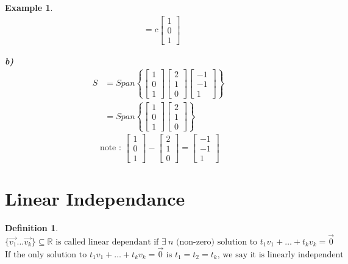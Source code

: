 \documentclass{article}
\newtheorem{ex}[theorem]{Example}
\newtheorem{definition}[theorem]{Definition}
\begin{document}
\begin{ex}
\begin{minipage}{.5\textwidth}
\[\begin{aligned}
& = c\begin{bmatrix} 1 \\ 0 \\ 1 \end{bmatrix} \end{aligned} \]
\end{minipage} %
\begin{minipage}{.5\textwidth} %
\textbf{b)}
\[ \begin{aligned} S & = Span\left\{ \begin{bmatrix} 1 \\ 0 \\ 1 \end{bmatrix} \begin{bmatrix} 2 \\ 1 \\  0\end{bmatrix} \begin{bmatrix} -1 \\ -1 \\ 1 \end{bmatrix} \right\} \\ 
& = Span\left\{ \begin{bmatrix} 1 \\ 0 \\ 1 \end{bmatrix} \begin{bmatrix} 2 \\ 1 \\  0\end{bmatrix} \right\} \end{aligned} \]
\[ \text{ note : } \begin{bmatrix} 1 \\ 0 \\ 1 \end{bmatrix} -  \begin{bmatrix} 2 \\ 1 \\  0\end{bmatrix} = \begin{bmatrix} -1 \\ -1 \\ 1 \end{bmatrix} \]
\end{minipage}
\end{ex}

\section{Linear Independance}
\begin{definition}
\[ \{ \vec{v_1} \ldots \vec{v_k} \} \subseteq \mathbb{R} \text{ is called linear dependant if } \exists \ n \text{ (non-zero) solution to }  t_1 v_1 + \ldots + t_k v_k  = \vec{0}\]
\[ \text {If the only solution to }  t_1 v_1 + \ldots + t_k v_k  = \vec{0}  
\text{ is } t_1 = t_2  = t_k \text{, we say it is linearly independent} \]
\end {definition}
\end{document}
